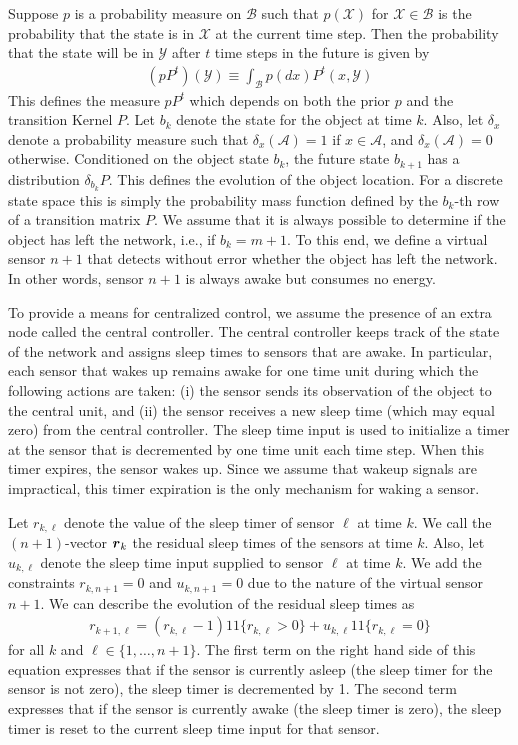 \documentclass[journal,draftcls,onecolumn,11pt]{IEEEtran}
\newcommand{\emb}[1]{\text{\boldmath{$#1$}}}
\newcommand{\indic}[1]{\mbox{$1\!\!1$}{\{#1\}}}
\begin{document}
Suppose $p$ is a probability measure on $\mathcal{B}$ such that $p(\mathcal{X})$ for $\mathcal{X} \in \mathcal{B}$ is the probability that the state is in $\mathcal{X}$ at the current time step.  Then the probability that the state will be in $\mathcal{Y}$ after $t$ time steps in the future is given by
\begin{align}
   (p P^t)(\mathcal{Y}) \equiv \int_{\mathcal{B}} p(dx) P^t(x,\mathcal{Y})
\end{align}
This defines the measure $p P^t$ which depends on both the prior $p$ and the transition Kernel $P$.  Let $b_k$ denote the state for the object at time $k$.  Also, let $\delta_x$ denote a probability measure such that $\delta_{x}(\mathcal{A}) = 1$ if $x \in \mathcal{A}$, and $\delta_{x}(\mathcal{A}) = 0$ otherwise. Conditioned on the object state $b_k$, the future state $b_{k+1}$ has a distribution $\delta_{b_k} P$. This defines the evolution of the object location. For a discrete state space this is simply the probability mass function defined by the $b_k$-th row of a transition matrix $P$.
We assume that it is always possible to determine if the object has left the network, i.e., if $b_k = m+1$.  To this end, we define a virtual sensor $n+1$ that detects without error whether the object has left the network. In other words, sensor $n+1$ is always awake but consumes no energy.

To provide a means for centralized control, we assume the presence of an extra node called the central controller.  The central controller keeps track of the state of the network and assigns sleep times to sensors that are awake.  In particular, each sensor that wakes up remains awake for one time unit during which the following actions are taken: (i) the sensor sends its observation of the object to the central unit, and (ii) the sensor receives a new sleep time (which may equal zero) from the central controller.  The sleep time input is used to initialize a timer at the sensor that is decremented by one time unit each time step.  When this timer expires, the sensor wakes up.  Since we assume that wakeup signals are impractical, this timer expiration is the only mechanism for waking a sensor.

Let $r_{k,\ell}$ denote the value of the sleep timer of sensor $\ell$ at time $k$.  We call the $(n+1)$-vector $\emb
{r}_k$ the residual sleep times of the sensors at time $k$.  Also, let $u_{k,\ell}$ denote the sleep time input supplied to sensor $\ell$ at time $k$.  We add the constraints $r_{k,n+1}=0$ and $u_{k,n+1}=0$ due to the nature of the virtual sensor $n+1$.  We can describe the evolution of the residual sleep times as
\begin{align} \label{eq:rklh}
   r_{k+1,\ell} = (r_{k,\ell} - 1) \indic{r_{k,\ell}> 0} + u_{k,\ell} \indic{r_{k,\ell} = 0}
\end{align}
for all $k$ and $\ell \in \{1,\dots,n+1\}$.  The first term on the right hand side of this equation expresses that if the sensor is currently asleep (the sleep timer for the sensor is not zero), the sleep timer is decremented by 1.  The second term expresses that if the sensor is currently awake (the sleep timer is zero), the sleep timer is reset to the current sleep time input for that sensor.
\end{document}
